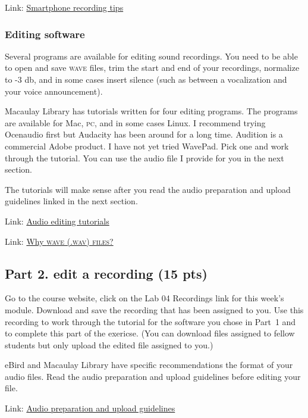 \documentclass[12pt]{article}
\begin{document}
Link: \href{https://support.ebird.org/en/support/solutions/articles/48001064305-smartphone-recording-tips}{Smartphone recording tips}

\subsubsection*{Editing software}

Several programs are available for editing sound recordings. You need to be able to open and save \textsc{wave} files, trim the start and end of your recordings, normalize to -3 db, and in some cases insert silence (such as between a vocalization and your voice announcement).

Macaulay Library has tutorials written for four editing programs. The programs are available for Mac, \textsc{pc,} and in some cases Linux. I recommend trying Ocenaudio first but Audacity has been around for a long time. Audition is a commercial Adobe product. I have not yet tried WavePad. Pick one and work through the tutorial. You can use the audio file I provide for you in the next section. 

The tutorials will make sense after you read the audio preparation and upload guidelines linked in the next section.

Link: \href{https://www.macaulaylibrary.org/resources/audio-editing-tutorials/}{Audio editing tutorials}

Link: \href{https://www.macaulaylibrary.org/resources/why-wav/}{Why \textsc{wave (.wav) files?}}

\subsection*{Part 2. edit a recording (15 pts)}

Go to the course website, click on the Lab 04 Recordings link for this week's module. Download and save the recording that has been assigned to you. Use this recording to work through the tutorial for the software you chose in Part~1 and to complete this part of the exericse. (You can download files assigned to fellow students but only upload the edited file assigned to you.)

eBird and Macaulay Library have specific recommendations the format of your audio files. Read the audio preparation and upload guidelines before editing your file.

Link: \href{https://support.ebird.org/en/support/solutions/articles/48001064341-audio-preparation-and-upload-guidelines}{Audio preparation and upload guidelines}
\end{document}
